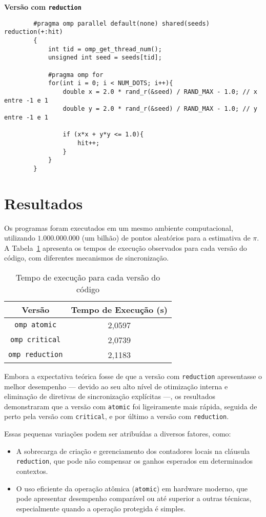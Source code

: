 \documentclass[a4paper, 12pt]{article}
\begin{document}
		\textbf{Versão com \texttt{reduction}}
	
	\begin{verbatim}
		#pragma omp parallel default(none) shared(seeds) reduction(+:hit)
		{
			int tid = omp_get_thread_num();
			unsigned int seed = seeds[tid];
			
			#pragma omp for
			for(int i = 0; i < NUM_DOTS; i++){
				double x = 2.0 * rand_r(&seed) / RAND_MAX - 1.0; // x entre -1 e 1
				double y = 2.0 * rand_r(&seed) / RAND_MAX - 1.0; // y entre -1 e 1
				
				if (x*x + y*y <= 1.0){
					hit++;
				}
			}
		}
	\end{verbatim}

	\section{Resultados}

	Os programas foram executados em um mesmo ambiente computacional, utilizando $1.000.000.000$ (um bilhão) de pontos aleatórios para a estimativa de $\pi$. A Tabela~\ref{tab:tempos} apresenta os tempos de execução observados para cada versão do código, com diferentes mecanismos de sincronização.
	
	\begin{table}[H]
		\centering
		\caption{Tempo de execução para cada versão do código}
		\label{tab:tempos}
		\begin{tabular}{|c|c|}
			\hline
			\textbf{Versão} & \textbf{Tempo de Execução (s)} \\
			\hline
			\texttt{omp atomic}    & 2,0597 \\
			\texttt{omp critical}  & 2,0739 \\
			\texttt{omp reduction} & 2,1183 \\
			\hline
		\end{tabular}
	\end{table}
	
	Embora a expectativa teórica fosse de que a versão com \texttt{reduction} apresentasse o melhor desempenho — devido ao seu alto nível de otimização interna e eliminação de diretivas de sincronização explícitas —, os resultados demonstraram que a versão com \texttt{atomic} foi ligeiramente mais rápida, seguida de perto pela versão com \texttt{critical}, e por último a versão com \texttt{reduction}.
	
	Essas pequenas variações podem ser atribuídas a diversos fatores, como:
	\begin{itemize}
		\item A sobrecarga de criação e gerenciamento dos contadores locais na cláusula \texttt{reduction}, que pode não compensar os ganhos esperados em determinados contextos.
		\item O uso eficiente da operação atômica (\texttt{atomic}) em hardware moderno, que pode apresentar desempenho comparável ou até superior a outras técnicas, especialmente quando a operação protegida é simples.
	\end{itemize}
	
\end{document}
